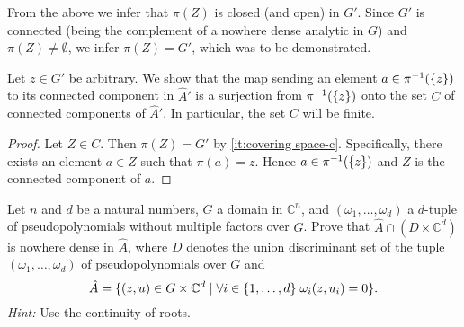 \documentclass[a4paper]{amsart}
\newcommand{\C}{\mathbb{C}}
\theoremstyle{remark}
\numberwithin{equation}{question}
\DeclarePairedDelimiter\set{\{}{\}}
\begin{document}
\begin{solution}
\begin{solenum}
From the above we infer that $\pi(Z)$ is closed (and open) in $G'$. Since $G'$ is connected (being the complement of a nowhere dense analytic in $G$) and $\pi(Z) \ne \emptyset$, we infer $\pi(Z) = G'$, which was to be demonstrated.

\item Let $z \in G'$ be arbitrary. We show that the map sending an element $a \in \pi^{-1}(\set z)$ to its connected component in $\hat A'$ is a surjection from $\pi^{-1}(\set z)$ onto the set $C$ of connected components of $\hat A'$. In particular, the set $C$ will be finite.

\begin{proof}
Let $Z \in C$. Then $\pi(Z) = G'$ by \cref{it:covering space-c}. Specifically, there exists an element $a \in Z$ such that $\pi(a) = z$. Hence $a \in \pi^{-1}(\set z)$ and $Z$ is the connected component of $a$.
\end{proof}
\end{solenum}
\end{solution}

\begin{question}[subtitle={Nowhere density of the points over the branch locus}]
\label{qu:points over branch}
Let $n$ and $d$ be a natural numbers, $G$ a domain in $\C^n$, and $(\omega_1,\dots,\omega_d)$ a $d$-tuple of pseudopolynomials without multiple factors over $G$. Prove that $\hat A \cap (D \times \C^d)$ is nowhere dense in $\hat A$, where $D$ denotes the union discriminant set of the tuple $(\omega_1,\dots,\omega_d)$ of pseudopolynomials over $G$ and
\[
\hat A = \set{(z,u) \in G \times \C^d \mid \forall i \in \set{1,\dots,d} \; \omega_i(z,u_i) = 0}.
\]
\emph{Hint:} Use the continuity of roots.
\end{question}
\end{document}
